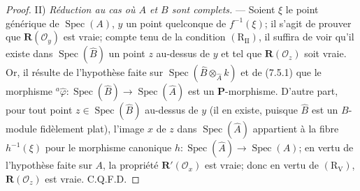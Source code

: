 \begin{proof}
II) \emph{Réduction au cas où $A$ et $B$ sont complets.} --- Soient $\xi$
le point générique de $\operatorname{Spec}(A)$, $y$ un point quelconque de
$f^{-1}(\xi)$; il s'agit de prouver que
$\boldsymbol R(\mathscr O_y)$ est vraie; compte tenu de la condition
$(\mathrm R_{\mathrm{II}})$, il suffira de voir qu'il existe dans
$\operatorname{Spec}(\widehat B)$ un point $z$ au-dessus de $y$ et tel que
$\boldsymbol R(\mathscr O_z)$ soit vraie. Or, il résulte de l'hypothèse
faite sur $\operatorname{Spec}(\widehat B\otimes_{\widehat A}k)$ et de
(7.5.1) que le morphisme
\enlargethispage{5\baselineskip}
${}^a\widehat\varphi:\operatorname{Spec}(\widehat B)
\to\operatorname{Spec}(\widehat A)$
est un $\boldsymbol P$-morphisme. D'autre part, pour tout point
$z\in\operatorname{Spec}(\widehat B)$ au-dessus de $y$ (il en existe,
puisque $\widehat B$ est un $B$-module fidèlement plat), l'image $x$ de $z$
dans $\operatorname{Spec}(\widehat A)$ appartient à la fibre
$h^{-1}(\xi)$ pour le morphisme canonique
$h:\operatorname{Spec}(\widehat A)\to\operatorname{Spec}(A)$; en vertu de
l'hypothèse faite sur $A$, la propriété
$\boldsymbol R'(\mathscr O_x)$ est vraie; donc en vertu de
$(\mathrm R_{\mathrm V})$, $\boldsymbol R(\mathscr O_z)$ est vraie.
C.Q.F.D.
\end{proof}

